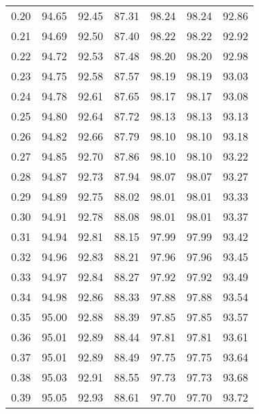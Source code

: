 \begin{tabular}{|c|c|c|c|c|c|c|}
      0.20 &     94.65 &     92.45 &      87.31 &   98.24 &      98.24 &         92.86 \\
      0.21 &     94.69 &     92.50 &      87.40 &   98.22 &      98.22 &         92.92 \\
      0.22 &     94.72 &     92.53 &      87.48 &   98.20 &      98.20 &         92.98 \\
      0.23 &     94.75 &     92.58 &      87.57 &   98.19 &      98.19 &         93.03 \\
      0.24 &     94.78 &     92.61 &      87.65 &   98.17 &      98.17 &         93.08 \\
      0.25 &     94.80 &     92.64 &      87.72 &   98.13 &      98.13 &         93.13 \\
      0.26 &     94.82 &     92.66 &      87.79 &   98.10 &      98.10 &         93.18 \\
      0.27 &     94.85 &     92.70 &      87.86 &   98.10 &      98.10 &         93.22 \\
      0.28 &     94.87 &     92.73 &      87.94 &   98.07 &      98.07 &         93.27 \\
      0.29 &     94.89 &     92.75 &      88.02 &   98.01 &      98.01 &         93.33 \\
      0.30 &     94.91 &     92.78 &      88.08 &   98.01 &      98.01 &         93.37 \\
      0.31 &     94.94 &     92.81 &      88.15 &   97.99 &      97.99 &         93.42 \\
      0.32 &     94.96 &     92.83 &      88.21 &   97.96 &      97.96 &         93.45 \\
      0.33 &     94.97 &     92.84 &      88.27 &   97.92 &      97.92 &         93.49 \\
      0.34 &     94.98 &     92.86 &      88.33 &   97.88 &      97.88 &         93.54 \\
      0.35 &     95.00 &     92.88 &      88.39 &   97.85 &      97.85 &         93.57 \\
      0.36 &     95.01 &     92.89 &      88.44 &   97.81 &      97.81 &         93.61 \\
      0.37 &     95.01 &     92.89 &      88.49 &   97.75 &      97.75 &         93.64 \\
      0.38 &     95.03 &     92.91 &      88.55 &   97.73 &      97.73 &         93.68 \\
      0.39 &     95.05 &     92.93 &      88.61 &   97.70 &      97.70 &         93.72 \\

\end{tabular}

